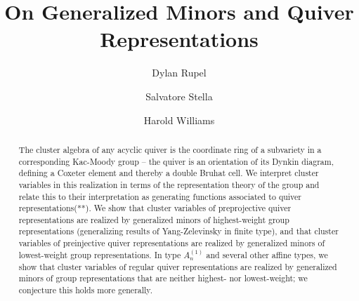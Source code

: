 \documentclass[12pt]{amsart}
\theoremstyle{remark}
\numberwithin{equation}{section}
\numberwithin{figure}{section}
\begin{document}
\title{On Generalized Minors and Quiver Representations}

\author[Rupel]{Dylan Rupel}
\address[Dylan Rupel]{University of Notre Dame}

\author[Stella]{Salvatore Stella}
\address[Salvatore Stella]{Universit\`a degli studi di Roma ``La Sapienza''}

\author[Williams]{Harold Williams}
\address[Harold Williams]{University of Texas at Austin}

\begin{abstract}
The cluster algebra of any acyclic quiver is the coordinate ring of a subvariety in a corresponding Kac-Moody group -- the quiver is an orientation of its Dynkin diagram, defining a Coxeter element and thereby a double Bruhat cell. We interpret cluster variables in this realization in terms of the representation theory of the group and relate this to their interpretation as generating functions associated to quiver representations(**). We show that cluster variables of preprojective quiver representations are realized by generalized minors of highest-weight group representations (generalizing results of Yang-Zelevinsky in finite type), and that cluster variables of preinjective quiver representations are realized by generalized minors of lowest-weight group representations. In type $A_n^{\!(1)}$ and several other affine types, we show that cluster variables of regular quiver representations are realized by generalized minors of group representations that are neither highest- nor lowest-weight; we conjecture this holds more generally.




\end{abstract}
\end{document}
